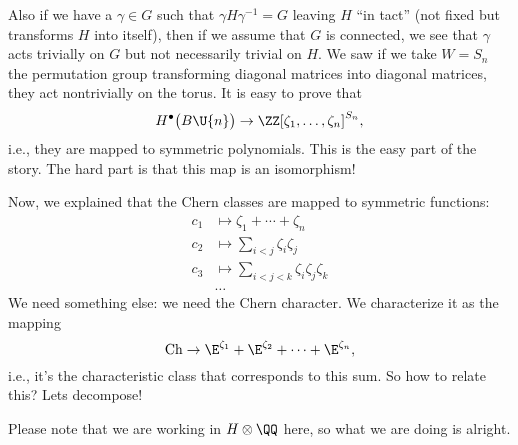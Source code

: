 Also if we have a $\gamma\in G$ such that $\gamma
H\gamma^{-1}=G$ leaving $H$ ``in tact'' (not fixed but transforms
$H$ into itself), then if we assume that $G$ is connected, we see
that $\gamma$ acts trivially on $G$ but not necessarily trivial
on $H$. We saw if we take $W=S_{n}$ the permutation group
transforming diagonal matrices into diagonal matrices, they act
nontrivially on the torus. It is easy to prove that 
\begin{equation}
H^{\bullet}\bigl(B\U{n}\bigr)\to\ZZ[\zeta_1,\dots,\zeta_n]^{S_{n}},
\end{equation}
i.e., they are mapped to symmetric polynomials. This is the easy
part of the story. The hard part is that this map is an
isomorphism!

Now, we explained that the Chern classes are mapped to symmetric
functions:
\begin{equation}
\begin{split}
c_{1}&\mapsto\zeta_1+\cdots+\zeta_n\\
c_{2}&\mapsto\sum_{i<j}\zeta_{i}\zeta_{j}\\
c_{3}&\mapsto\sum_{i<j<k}\zeta_{i}\zeta_{j}\zeta_{k}\\
&\dots
\end{split}
\end{equation}
We need something else: we need the Chern character. We
characterize it as the mapping
\begin{equation}
\chernChar\to \E^{\zeta_{1}}+\E^{\zeta_{2}}+\dots+\E^{\zeta_{n}},
\end{equation}
i.e., it's the characteristic class that corresponds to this
sum. So how to relate this? Lets decompose!

\begin{danger}
Please note that we are working in $H\otimes\QQ$ here, so what we
are doing is alright.
\end{danger}

